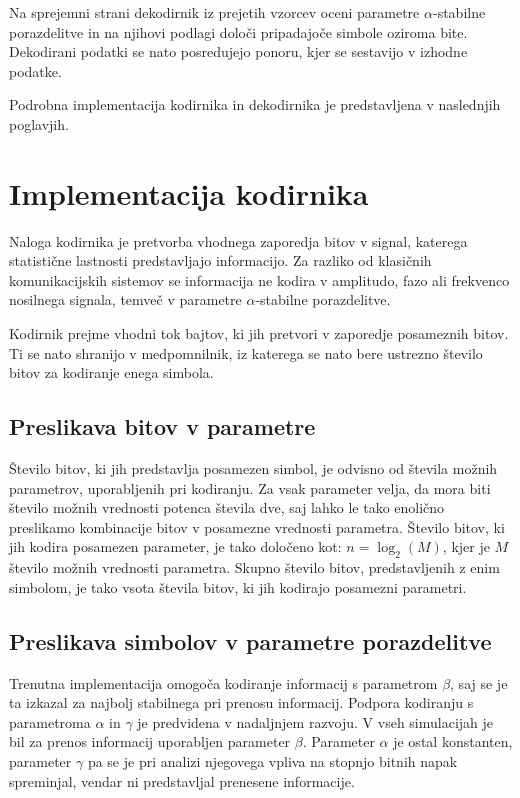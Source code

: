 \documentclass[a4paper, 12pt, openany]{book}
\begin{document}
Na sprejemni strani dekodirnik iz prejetih vzorcev oceni parametre $\alpha$-stabilne porazdelitve in na njihovi podlagi določi pripadajoče simbole oziroma bite. Dekodirani podatki se nato posredujejo ponoru, kjer se sestavijo v izhodne podatke.

Podrobna implementacija kodirnika in dekodirnika je predstavljena v naslednjih poglavjih.


\section{Implementacija kodirnika}

Naloga kodirnika je pretvorba vhodnega zaporedja bitov v signal, katerega statistične lastnosti predstavljajo informacijo. Za razliko od klasičnih komunikacijskih sistemov se informacija ne kodira v amplitudo, fazo ali frekvenco nosilnega signala, temveč v parametre $\alpha$-stabilne porazdelitve.

Kodirnik prejme vhodni tok bajtov, ki jih pretvori v zaporedje posameznih bitov. Ti se nato shranijo v medpomnilnik, iz katerega se nato bere ustrezno število bitov za kodiranje enega simbola.

\subsection{Preslikava bitov v parametre}

Število bitov, ki jih predstavlja posamezen simbol, je odvisno od števila možnih parametrov, uporabljenih pri kodiranju. Za vsak parameter velja, da mora biti število možnih vrednosti potenca števila dve, saj lahko le tako enolično preslikamo kombinacije bitov v posamezne vrednosti parametra. Število bitov, ki jih kodira posamezen parameter, je tako določeno kot: $n = \log_2(M)$, kjer je $M$ število možnih vrednosti parametra. Skupno število bitov, predstavljenih z enim simbolom, je tako vsota števila bitov, ki jih kodirajo posamezni parametri.

\subsection{Preslikava simbolov v parametre porazdelitve}
Trenutna implementacija omogoča kodiranje informacij s parametrom $\beta$, saj se je ta izkazal za najbolj stabilnega pri prenosu informacij. Podpora kodiranju s parametroma $\alpha$ in $\gamma$ je predvidena v nadaljnjem razvoju. V vseh simulacijah je bil za prenos informacij uporabljen parameter $\beta$. Parameter $\alpha$ je ostal konstanten, parameter $\gamma$ pa se je pri analizi njegovega vpliva na stopnjo bitnih napak spreminjal, vendar ni predstavljal prenesene informacije.
\end{document}

